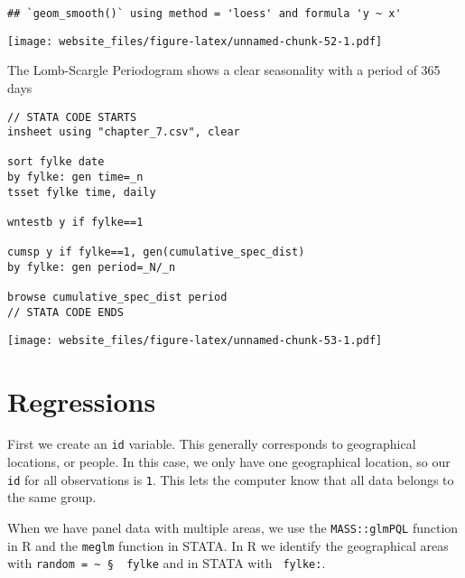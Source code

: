 \documentclass[]{book}
\newenvironment{Shaded}{\begin{snugshade}}{\end{snugshade}}
\newcommand{\KeywordTok}[1]{\textcolor[rgb]{0.13,0.29,0.53}{\textbf{#1}}}
\newcommand{\DataTypeTok}[1]{\textcolor[rgb]{0.13,0.29,0.53}{#1}}
\newcommand{\DecValTok}[1]{\textcolor[rgb]{0.00,0.00,0.81}{#1}}
\newcommand{\StringTok}[1]{\textcolor[rgb]{0.31,0.60,0.02}{#1}}
\newcommand{\CommentTok}[1]{\textcolor[rgb]{0.56,0.35,0.01}{\textit{#1}}}
\newcommand{\OperatorTok}[1]{\textcolor[rgb]{0.81,0.36,0.00}{\textbf{#1}}}
\newcommand{\NormalTok}[1]{#1}
\begin{document}
\begin{verbatim}
## `geom_smooth()` using method = 'loess' and formula 'y ~ x'
\end{verbatim}

\texttt{[image: website\_files/figure-latex/unnamed-chunk-52-1.pdf]}

\newpage

The Lomb-Scargle Periodogram shows a clear seasonality with a period of
365 days

\begin{verbatim}
// STATA CODE STARTS
insheet using "chapter_7.csv", clear

sort fylke date
by fylke: gen time=_n
tsset fylke time, daily

wntestb y if fylke==1

cumsp y if fylke==1, gen(cumulative_spec_dist)
by fylke: gen period=_N/_n

browse cumulative_spec_dist period
// STATA CODE ENDS
\end{verbatim}

\begin{Shaded}
\end{Shaded}

\texttt{[image: website\_files/figure-latex/unnamed-chunk-53-1.pdf]}

\newpage

\section{Regressions}\label{regressions-1}

First we create an \texttt{id} variable. This generally corresponds to
geographical locations, or people. In this case, we only have one
geographical location, so our \texttt{id} for all observations is
\texttt{1}. This lets the computer know that all data belongs to the
same group.

When we have panel data with multiple areas, we use the
\texttt{MASS::glmPQL} function in R and the \texttt{meglm} function in
STATA. In R we identify the geographical areas with
\texttt{random\ =\ \textasciitilde{}\ §\ \textbar{}\ fylke} and in STATA
with \texttt{\textbar{}\textbar{}\ fylke:}.
\end{document}
